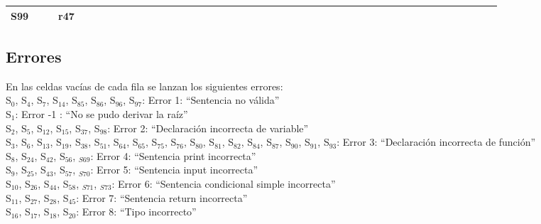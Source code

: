 \documentclass[a4paper, 12pt]{article}
\begin{document}
\begin{table}[htbp]
\begin{turn}{90}
{\begin{tabular}{|l|c|c|c|c|c|c|c|c|c|c|c|c|c|c|c|c|c|c|c|c|c|c|c|c|c||c|c|c|c|c|c|c|c|c|c|c|c|c|c|c|c|c|c|c|c|}
    \midrule
    S99   &       &       & r47   &       &       &       &       &       &       &       &       &       &       &       &       &       &       &       &       &       &       &       &       &       &       &       &       &       &       &       &       &       &       &       &       &       &       &       &       &       &       &       &       &       &  \\
 \bottomrule
    \end{tabular}} %
\end{turn}
  \label{tab:addlabel}%
\end{table}%

\subsection{Errores}
En las celdas vacías de cada fila se lanzan los siguientes errores:\\

S$_0$, S$_4$, S$_7$, S$_{14}$, S$_{85}$, S$_{86}$, S$_{96}$, S$_{97}$: Error 1: “Sentencia no válida” \\

S$_{1}$: Error -1 : “No se pudo derivar la raíz”\\

S$_{2}$, S$_{5}$, S$_{12}$, S$_{15}$, S$_{37}$, S$_{98}$: Error 2: “Declaración incorrecta de variable”\\

S$_{3}$, S$_{6}$, S$_{13}$, S$_{19}$, S$_{38}$, S$_{51}$, S$_{64}$, S$_{65}$, S$_{75}$, S$_{76}$, S$_{80}$, S$_{81}$, S$_{82}$, S$_{84}$, S$_{87}$, S$_{90}$, S$_{91}$, S$_{93}$: Error 3: “Declaración incorrecta de función”\\

S$_{8}$, S$_{24}$, S$_{42}$, S$_{56}$, $_{S69}$: Error 4: “Sentencia print incorrecta”\\

S$_{9}$, S$_{25}$, S$_{43}$, S$_{57}$, $_{S70}$: Error 5: “Sentencia input incorrecta”\\

S$_{10}$, S$_{26}$, S$_{44}$, S$_{58}$, $_{S71}$, $_{S73}$: Error 6: “Sentencia condicional simple incorrecta”\\

S$_{11}$, S$_{27}$, S$_{28}$, S$_{45}$: Error 7: “Sentencia return incorrecta”\\

S$_{16}$, S$_{17}$, S$_{18}$, S$_{20}$: Error 8: “Tipo incorrecto”\\
\end{document}
